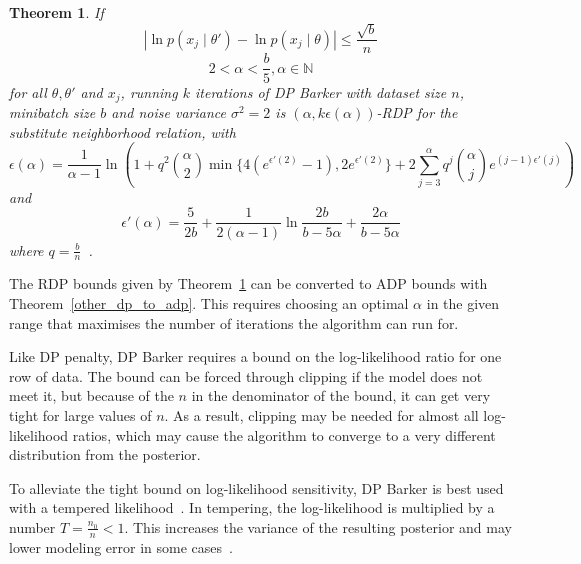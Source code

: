 \documentclass[english,twoside,openright]{HYgraduMLDS}
\newtheorem{theorem}{Theorem}
\newcommand{\N}{\mathbb{N}}
\begin{document}
\begin{theorem}\label{dp_barker_theorem}
    If
    \[
        |\ln p(x_j\mid \theta') - \ln p(x_j\mid \theta)| \leq \frac{\sqrt{b}}{n}
    \]
    \[
        2 < \alpha < \frac{b}{5}, \alpha \in \N
    \]
    for all \(\theta, \theta'\) and \(x_{j}\),
    running \(k\) iterations of DP Barker with dataset size \(n\),
    minibatch size \(b\) and noise variance \(\sigma^{2} = 2\)
    is \((\alpha, k\epsilon(\alpha))\)-RDP for the substitute neighborhood
    relation, with
    \[
        \epsilon(\alpha) = \frac{1}{\alpha - 1}\ln \left(
        1 + q^2\binom{\alpha}{2}\min\{4(e^{\epsilon'(2)} - 1), 2e^{\epsilon'(2)}\}
        + 2 \sum_{j=3}^\alpha q^j\binom{\alpha}{j}e^{(j-1)\epsilon'(j)}\right)
    \]
    and 
    \[
        \epsilon'(\alpha) = \frac{5}{2b} + \frac{1}{2(\alpha - 1)}
        \ln \frac{2b}{b - 5\alpha} + \frac{2\alpha}{b - 5\alpha}
    \]
    where \(q = \frac{b}{n}\)~\cite{HeikkilaJDH19}.
\end{theorem}
The RDP bounds given by Theorem~\ref{dp_barker_theorem} can be converted to
ADP bounds with Theorem~\ref{other_dp_to_adp}. This requires choosing an
optimal \(\alpha\) in the given range that maximises the number of iterations
the algorithm can run for.


Like DP penalty, DP Barker requires a bound on the log-likelihood ratio for
one row of data. The bound can be forced through clipping if the model does not 
meet it, but because of the \(n\) in the denominator of the bound, it can get 
very tight for large values of \(n\). As a result, clipping may be needed for 
almost all log-likelihood ratios, which may cause the algorithm to converge
to a very different distribution from the posterior.

To alleviate the tight bound on log-likelihood sensitivity, DP Barker is best
used with a tempered likelihood~\cite{HeikkilaJDH19}. In tempering, the 
log-likelihood is multiplied by a number \(T = \frac{n_0}{n} < 1\). This
increases the variance of the resulting posterior and may lower modeling 
error in some cases~\cite{HeikkilaJDH19}.
\end{document}
